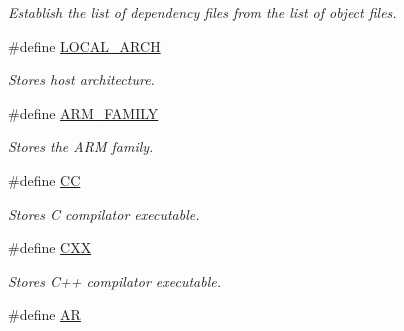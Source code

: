 \begin{DoxyCompactItemize}
\begin{DoxyCompactList}\small\item\em Establish the list of dependency files from the list of object files. \end{DoxyCompactList}\item 
\hypertarget{group___automatic___variables_ga2a0556694137e2667fb6564e99e2dcef}{\#define \hyperlink{group___automatic___variables_ga2a0556694137e2667fb6564e99e2dcef}{L\+O\+C\+A\+L\+\_\+\+A\+R\+C\+H}}\label{group___automatic___variables_ga2a0556694137e2667fb6564e99e2dcef}

\begin{DoxyCompactList}\small\item\em Stores host architecture. \end{DoxyCompactList}\item 
\#define \hyperlink{group___automatic___variables_ga9682580d83fbc88967858af8593df6df}{A\+R\+M\+\_\+\+F\+A\+M\+I\+L\+Y}
\begin{DoxyCompactList}\small\item\em Stores the A\+R\+M family. \end{DoxyCompactList}\item 
\hypertarget{group___automatic___variables_ga78d126676907aa89a0adbfbef8282585}{\#define \hyperlink{group___automatic___variables_ga78d126676907aa89a0adbfbef8282585}{C\+C}}\label{group___automatic___variables_ga78d126676907aa89a0adbfbef8282585}

\begin{DoxyCompactList}\small\item\em Stores C compilator executable. \end{DoxyCompactList}\item 
\hypertarget{group___automatic___variables_ga015ed04a5a5b8338fca972afb4ad65d8}{\#define \hyperlink{group___automatic___variables_ga015ed04a5a5b8338fca972afb4ad65d8}{C\+X\+X}}\label{group___automatic___variables_ga015ed04a5a5b8338fca972afb4ad65d8}

\begin{DoxyCompactList}\small\item\em Stores C++ compilator executable. \end{DoxyCompactList}\item 
\hypertarget{group___automatic___variables_ga6f98ae7b0908254a0dfd1627e652bebe}{\#define \hyperlink{group___automatic___variables_ga6f98ae7b0908254a0dfd1627e652bebe}{A\+R}}\label{group___automatic___variables_ga6f98ae7b0908254a0dfd1627e652bebe}


\end{DoxyCompactItemize}
